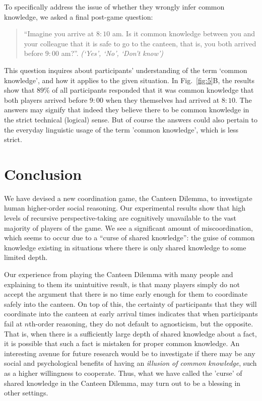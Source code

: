 \documentclass[twocolumn,a4paper,superscriptaddress,nofootinbib]{revtex4}
\begin{document}
To specifically address the issue of whether they wrongly infer common knowledge, we asked a final post-game question:

\begin{quote}
\indent
``Imagine you arrive at $8{:}10$ am. Is it common knowledge between you and your colleague that it is safe to go to the canteen, that is, you both arrived before $9{:}00$ am?''. \textit{(`Yes', `No', `Don't know')}
\end{quote}

\noindent
This question inquires about participants' understanding of the term `common knowledge', and how it applies to the given situation. In Fig.~\ref{fig:5}B, the results show that $89\%$ of all participants responded that it was common knowledge that both players arrived before $9{:}00$ when they themselves had arrived at $8{:}10$. The answers may signify that indeed they believe there to be common knowledge in the strict technical (logical) sense. But of course the answers could also pertain to the everyday linguistic usage of the term ’common knowledge’, which is less strict.

\section{Conclusion} \label{S:conclusion}
We have devised a new coordination game, the Canteen Dilemma, to investigate human higher-order social reasoning. Our experimental results show that high levels of recursive perspective-taking are cognitively unavailable to the vast majority of players of the game. We see a significant amount of miscoordination, which seems to occur due to a ``curse of shared knowledge'': the guise of common knowledge existing in situations where there is only shared knowledge to some limited depth. 

Our experience from playing the Canteen Dilemma with many people and explaining to them its unintuitive result, is that many players simply do not accept the argument that there is no time early enough for them to coordinate safely into the canteen. On top of this, the certainty of participants that they will coordinate into the canteen at early arrival times indicates that when participants fail at $n$th-order reasoning, they do not default to agnosticism, but the opposite. That is, when there is a sufficiently large depth of shared knowledge about a fact, it is possible that such a fact is mistaken for proper common knowledge. An interesting avenue for future research would be to investigate if there may be any social and psychological benefits of having an {\em illusion of common knowledge}, such as a higher willingness to cooperate. Thus, what we have called the 'curse' of shared knowledge in the Canteen Dilemma, may turn out to be a blessing in other settings.
\end{document}
